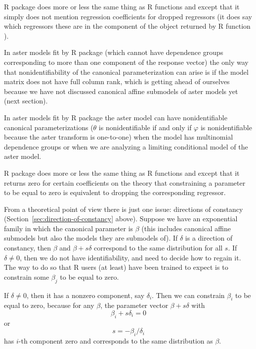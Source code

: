 R package  does more or less the same thing as R functions
 and  except that it simply does not mention regression
coefficients for dropped regressors (it does say which regressors these are
in the component  of the object returned by R function
).

In aster models fit by R package  (which cannot have dependence
groups corresponding to more than one component of the response vector)
the only way that nonidentifiability of the canonical parameterization
can arise is if the model matrix does not have full column rank,
which is getting ahead of ourselves because we have not discussed
canonical affine submodels of aster models yet (next section).

In aster models fit by R package  the aster model can
have nonidentifiable canonical parameterizations ($\theta$ is nonidentifiable
if and only if $\varphi$ is nonidentifiable because the aster transform
is one-to-one) when the model has multinomial dependence groups or when
we are analyzing a limiting conditional model of the aster model.

R package  does more or less the same thing as R functions
 and  except that it returns zero for certain
coefficients on the theory that constraining a parameter to be equal to zero
is equivalent to dropping the corresponding regressor. 

From a theoretical point of view there is just one issue: directions of
constancy (Section~\ref{sec:direction-of-constancy} above).
Suppose we have an exponential family in which the canonical parameter
is $\beta$ (this includes canonical affine submodels but also the models
they are submodels of).  If $\delta$ is a direction of constancy, then
$\beta$ and $\beta + s \delta$ correspond to the same distribution for
all $s$.  If $\delta \neq 0$, then we do not have identifiability, and
need to decide how to regain it.  The way to do so that R users (at least)
have been trained to expect is to constrain some $\beta_j$ to be equal
to zero.

If $\delta \neq 0$, then it has a nonzero component, say $\delta_i$.
Then we can constrain $\beta_i$ to be equal to zero, because for any
$\beta$, the parameter vector $\beta + s \delta$ with
$$
   \beta_i + s \delta_i = 0
$$
or
$$
   s = - \beta_i / \delta_i
$$
has $i$-th component zero and corresponds to the same distribution as $\beta$.

